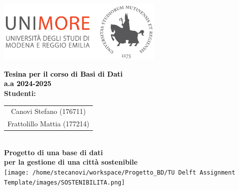 \begin{titlepage}
\begin{center}
    \includegraphics[width=0.6\textwidth]{images/Logo_C_Positivo_Colore.png}

    \vspace*{2cm}  %

    {\Huge \textbf{\textcolor{black}{Tesina per il corso di Basi di Dati \\ a.a 2024-2025 }}}\\[1.5cm]
    {\Large \textbf{\textcolor{tudelftdarkblue}{Studenti:}}}\\[0.5cm]
    \begin{tabular}{c}
        \Large \textcolor{tudelftdarkblue}{Canovi Stefano (176711)} \\ 
        \Large \textcolor{tudelftdarkblue}{Frattolillo Mattia (177214)} \\ 
    \end{tabular}\\[2cm]
    
    \vspace*{1cm}
    {\Large \textbf{\textcolor{tudelftdarkblue}{Progetto di una base di dati\\ per la gestione di una città sostenibile }}}\\[1.3cm]
    \texttt{[image: /home/stecanovi/workspace/Progetto\_BD/TU Delft Assignment Template/images/SOSTENIBILITA.png]}

    \end{center}  %
\end{titlepage}